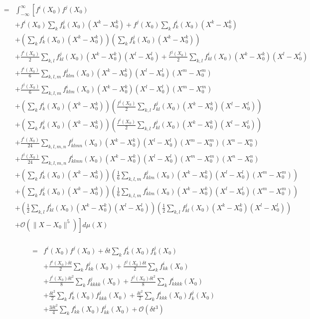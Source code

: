 \documentclass[12pt]{article}
\begin{document}
\begin{eqnarray}
&=& \int_{-\infty}^{\infty} \left[ 
f^i(X_0) f^j(X_0) \right. \\
&&+ f^i(X_0) \sum_k f^j_k(X_0) (X^k-X_0^k) 
+ f^j(X_0) \sum_k f^i_k(X_0) (X^k-X_0^k) \\
&& + \left(  \sum_k f^i_k(X_0) (X^k-X_0^k)  \right) \left(  \sum_k f^j_k(X_0) (X^k-X_0^k)  \right) \\
&& \left. + \frac{f^i(X_0)}{2} \sum_{k,l} f^j_{kl}(X_0) (X^k-X_0^k) (X^l-X_0^l) 
+ \frac{f^j(X_0)}{2} \sum_{k,l} f^i_{kl}(X_0) (X^k-X_0^k) (X^l-X_0^l)  \right. \\
&& + \frac{f^i(X_0)}{6} \sum_{k,l,m} f^j_{klm} (X_0) (X^k-X_0^k) (X^l-X_0^l) (X^m-X_0^m) \\
&& + \frac{f^j(X_0)}{6} \sum_{k,l,m} f^i_{klm} (X_0) (X^k-X_0^k) (X^l-X_0^l) (X^m-X_0^m) \\
&& + \left(\sum_k f^i_k(X_0) (X^k-X_0^k) \right) \left( \frac{f^j(X_0)}{2} \sum_{k,l} f^j_{kl}(X_0) (X^k-X_0^k) (X^l-X_0^l)  \right) \\
&& + \left(\sum_k f^j_k(X_0) (X^k-X_0^k) \right) \left( \frac{f^i(X_0)}{2} \sum_{k,l} f^j_{kl}(X_0) (X^k-X_0^k) (X^l-X_0^l)  \right)\\
&&+ \frac{f^i(X_0) }{24} \sum_{k,l,m,n} f^j_{klmn} (X_0) (X^k-X_0^k) (X^l-X_0^l) (X^m-X_0^m) (X^n-X_0^n) \\
&& + \frac{f^j(X_0) }{24} \sum_{k,l,m,n} f^i_{klmn} (X_0) (X^k-X_0^k) (X^l-X_0^l) (X^m-X_0^m) (X^n-X_0^n) \\
&& + \left( \sum_k f^i_k(X_0) (X^k-X_0^k) \right) \left( \frac{1}{6} \sum_{k,l,m} f^j_{klm} (X_0) (X^k-X_0^k) (X^l-X_0^l) (X^m-X_0^m)  \right) \\
&& + \left( \sum_k f^j_k(X_0) (X^k-X_0^k) \right) \left( \frac{1}{6} \sum_{k,l,m} f^i_{klm} (X_0) (X^k-X_0^k) (X^l-X_0^l) (X^m-X_0^m)  \right) \\
&&+ \left( \frac{1}{2} \sum_{k,l} f^i_{kl}(X_0) (X^k-X_0^k) (X^l-X_0^l)  \right) \left( \frac{1}{2} \sum_{k,l} f^j_{kl}(X_0) (X^k-X_0^k) (X^l-X_0^l)  \right) \\
&&\left. + \mathcal{O}\left( \| X- X_0 \|^5 \right) \right] d\mu(X) \\
 \end{eqnarray}
 
\begin{eqnarray}
&=& 
f^i(X_0) f^j(X_0)  + \delta t \sum_k f^i_k(X_0)  f^j_k(X_0) \\
&&  + \frac{f^i(X_0) \delta t}{2} \sum_{k} f^j_{kk}(X_0)
+ \frac{f^j(X_0) \delta t}{2} \sum_{k} f^i_{kk}(X_0)  \\
&&+ \frac{f^i(X_0) \delta t^2}{8} \sum_{k} f^j_{kkkk} (X_0) 
 + \frac{f^j(X_0) \delta t^2}{8} \sum_{k} f^i_{kkkk} (X_0)\\
&& + \frac{\delta t^2}{2} \sum_k f^i_k(X_0) f^j_{kkk} (X_0)  
 + \frac{\delta t^2}{2} \sum_k  f^i_{kkk} (X_0) f^j_k(X_0) \\
&&+  \frac{3  \delta t^2}{4} \sum_{k} f^i_{kk}(X_0) f^j_{kk}(X_0) 
 + \mathcal{O}\left( \delta t^3 \right) 
\end{eqnarray}
\end{document}
